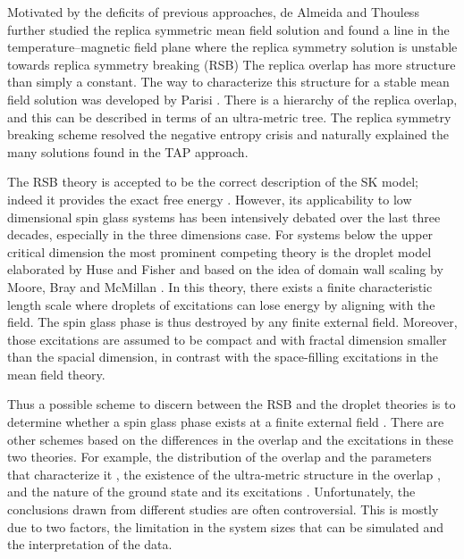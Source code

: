 Motivated by the deficits of previous approaches, de Almeida and Thouless
further studied the replica symmetric mean field solution and found a line 
in the temperature--magnetic field plane where the replica symmetry
solution is unstable towards replica symmetry breaking (RSB) \cite{Almedia-Thouless-1978,Bray-Moore-1978}
The replica overlap has more structure than simply a constant. The way to 
characterize this structure for a stable mean field solution was developed 
by Parisi \cite{Parisi-1980a,Parisi-1980b,Parisi-1980c}.  There is a hierarchy 
of the replica overlap, and this can be described in terms of an ultra-metric tree. 
The replica symmetry breaking scheme resolved the negative entropy crisis and naturally 
explained the many solutions found in the TAP approach.

The RSB theory is accepted to be the correct description of the SK model; indeed 
it provides the exact free energy \cite{Talagrand-2006,Guerra-2003}. 
However, its applicability to low dimensional spin glass systems has been intensively debated 
over the last three decades, especially in the three dimensions case. For systems 
below the upper critical dimension \cite{Harris-Lubensky-Chen-1976,Tasaki-1989,Green-Moore-Bray-1983} 
the most prominent competing theory is the droplet model elaborated by 
Huse and Fisher \cite{Fisher-Huse-1988,Fisher-Huse-1987} and based on the idea of 
domain wall scaling by Moore, Bray and McMillan \cite{McMillan-1984,Bray-Moore-1987}. 
In this theory, there exists a finite characteristic length scale where droplets of 
excitations can lose energy by aligning with the field. The spin glass phase is thus 
destroyed by any finite external field. Moreover, those excitations are assumed to 
be compact and with fractal dimension smaller than the spacial dimension, in contrast 
with the space-filling excitations in the mean field theory. 

Thus a possible scheme to discern between the RSB and the droplet theories is to determine
whether a spin glass phase exists at a finite external field \cite{Young-Katzgraber2004}. 
There are other schemes based on the differences in the overlap and the excitations in these two theories. 
For example, the distribution of the overlap and the parameters that characterize it \cite{Hatano-Gubernatis-2002, 
Marinari-etal-1998,Marinari-etal-1999,Bokil-etal-1999,Moore-etal-1998,Monthus-Garel-2013}, 
the existence of the ultra-metric structure in the overlap \cite{Hed-Young-Domany-2004,Contucci-etal-2007}, 
and the nature of the ground state and its 
excitations \cite{Palassini-Young-2000a,Palassini-Young-2000b,Aspelmeier-Moore-Young-2003,Marinari-Parisi-2001,
Houdayer-Martin-1999,Marinari-Parisi-Zuliani-2000,Marinari-etal-1999}.
Unfortunately, the conclusions drawn from different studies are often controversial.  
This is mostly due to two factors, the limitation in the system sizes that can be 
simulated and the interpretation of the data. 

